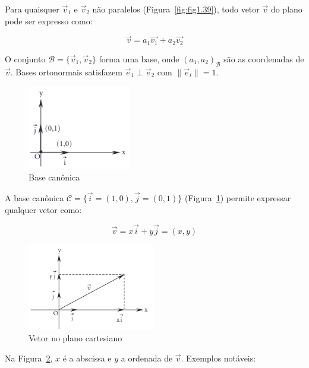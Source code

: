 Para quaisquer $\vec{v}_1$ e $\vec{v}_2$ não paralelos
(Figura~\ref{fig:fig1.39}), todo vetor $\vec{v}$ do plano pode ser expresso
como:

\begin{equation}\label{eq:combinacao-linear}
  \vec{v} = a_1\vec{v_1} + a_2\vec{v_2}
\end{equation}

O conjunto $\mathcal{B} = \{\vec{v}_1, \vec{v}_2\}$ forma uma base, onde
$(a_1,a_2)_\mathcal{B}$ são as coordenadas de $\vec{v}$. Bases ortonormais
satisfazem $\vec{e}_1 \perp \vec{e}_2$ com $\|\vec{e}_i\|=1$.

\begin{figure}[H]
  \centering
  \includegraphics[width=0.4\textwidth]{./fig/fig1.40.png}
  \caption{Base canônica}\label{fig:fig1.40}
\end{figure}

A base canônica $\mathcal{C} = \{\vec{i}=(1,0), \vec{j}=(0,1)\}$
(Figura~\ref{fig:fig1.40}) permite expressar qualquer vetor como:

\begin{equation}\label{eq:combinacao-linear-base-canonica}
  \vec{v} = x\vec{i} + y\vec{j} = (x,y)
\end{equation}

\newpage
\begin{figure}[H]
  \centering
  \includegraphics[width=0.5\textwidth]{./fig/fig1.41.png}
  \caption{Vetor no plano cartesiano}\label{fig:fig1.41}
\end{figure}

Na Figura~\ref{fig:fig1.41}, $x$ é a abscissa e $y$ a ordenada de $\vec{v}$.
Exemplos notáveis:

